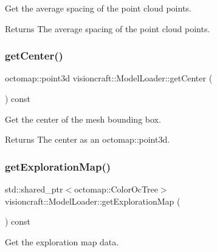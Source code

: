Get the average spacing of the point cloud points. 

\begin{DoxyReturn}{Returns}
The average spacing of the point cloud points. 
\end{DoxyReturn}
\mbox{\label{classvisioncraft_1_1ModelLoader_a8c495bcdad1fa88a7467299de897556a}} 
\subsubsection{\texorpdfstring{get\+Center()}{getCenter()}}
{\footnotesize\ttfamily octomap\+::point3d visioncraft\+::\+Model\+Loader\+::get\+Center (\begin{DoxyParamCaption}{ }\end{DoxyParamCaption}) const\hspace{0.3cm}{\ttfamily [inline]}}



Get the center of the mesh bounding box. 

\begin{DoxyReturn}{Returns}
The center as an octomap\+::point3d. 
\end{DoxyReturn}
\mbox{\label{classvisioncraft_1_1ModelLoader_a61eca982997a4ad7ecb829079149e066}} 
\subsubsection{\texorpdfstring{get\+Exploration\+Map()}{getExplorationMap()}}
{\footnotesize\ttfamily std\+::shared\+\_\+ptr$<$octomap\+::\+Color\+Oc\+Tree$>$ visioncraft\+::\+Model\+Loader\+::get\+Exploration\+Map (\begin{DoxyParamCaption}{ }\end{DoxyParamCaption}) const\hspace{0.3cm}{\ttfamily [inline]}}



Get the exploration map data. 

